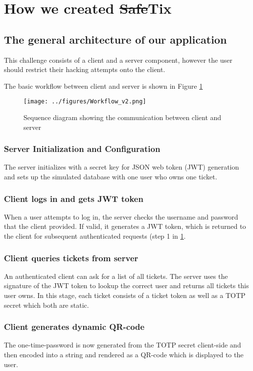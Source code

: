 \section{How we created \sout{Safe}Tix}
\subsection{The general architecture of our application}

This challenge consists of a client and a server component, however the user should restrict their hacking attempts onto the client.

The basic workflow between client and server is shown in Figure \ref{fig:WorkFlow2}
\begin{figure}[H]
    \centering
    \texttt{[image: ../figures/Workflow\_v2.png]}
    \caption{Sequence diagram showing the communication between client and server}
    \label{fig:WorkFlow2}
\end{figure}

\subsubsection{Server Initialization and Configuration}
The server initializes with a secret key for JSON web token (JWT) generation and sets up the simulated database with one user who owns one ticket.

\subsubsection{Client logs in and gets JWT token}
When a user attempts to log in, the server checks the username and password that the client provided. If valid, it generates a JWT token, which is returned to the client for subsequent authenticated requests (step 1 in \ref{fig:WorkFlow2}.

\subsubsection{Client queries tickets from server}
An authenticated client can ask for a list of all tickets. The server uses the signature of the JWT token to lookup the correct user and returns all tickets this user owns. In this stage, each ticket consists of a ticket token as well as a TOTP secret which both are static.

\subsubsection{Client generates dynamic QR-code}
The one-time-password is now generated from the TOTP secret client-side and then encoded into a string and rendered as a QR-code which is displayed to the user.


